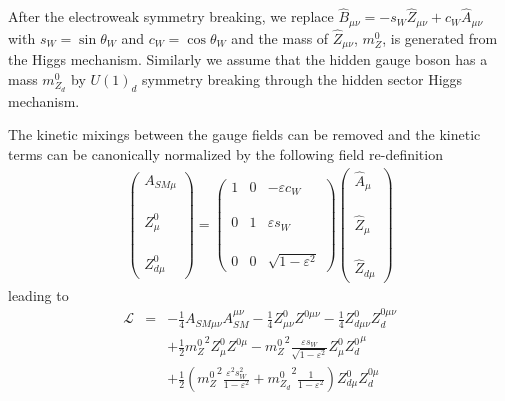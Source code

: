 \documentclass[5p,times]{elsarticle}
\newcommand\ba{\begin{eqnarray}}
\newcommand\ea{\end{eqnarray}}
\begin{document}
 After the electroweak symmetry breaking, we replace $\hat{B}_{\mu\nu}= -s_W \hat{Z}_{\mu \nu} + c_W \hat{A}_{\mu \nu}$ with $s_W=\sin\theta_W$ and $c_W=\cos\theta_W$ and the mass of $\hat{Z}_{\mu \nu}$, $m_Z^0$, is generated from the Higgs mechanism. Similarly we assume that the hidden gauge boson has a mass $m_{Z_d}^0$ by $U(1)_d$ symmetry breaking through the hidden sector Higgs mechanism.
 
  
The kinetic mixings between the gauge fields can be removed and the kinetic terms can be canonically normalized by the following field re-definition
   \ba
\left( \begin{array}{c} A_{SM\mu} \\ \phantom{1} \\ Z_\mu^0 \\ \phantom{1} \\ Z_{d\mu}^0 \end{array} \right) = \left( \begin{array}{ccc} 1&0 & -\varepsilon c_W \\ \phantom{1}&\phantom{1} & \phantom{1} \\0&1&\varepsilon s_W \\ \phantom{1}&\phantom{1} & \phantom{1}\\ 0& 0& \sqrt{1-\varepsilon^2} \end{array} \right) \left( \begin{array}{c} \hat{A}_\mu\\ \phantom{1} \\ \hat{Z}_\mu \\ \phantom{1} \\ \hat{Z}_{d\mu} \end{array} \right)
\ea
  leading to
   \ba
\mathcal{L}&=&-\frac{1}{4}A_{SM\mu\nu}A_{SM}^{\mu\nu}-\frac{1}{4}Z^0_{\mu\nu}Z^{0\mu\nu}-\frac{1}{4}Z^0_{d\mu\nu}Z_d^{0\mu\nu}\nonumber\\
&&+\frac{1}{2}{m_Z^0}^2Z^0_\mu Z^{0\mu}-{m_Z^0}^2\frac{\varepsilon s_W}{\sqrt{1-\varepsilon^2}}Z^0_\mu {Z^0_d}^\mu\nonumber\\
&&+\frac{1}{2}\left({m_Z^0}^2\frac{\varepsilon^2s^2_W}{1-\varepsilon^2} +{m_{Z_d}^0}^2\frac{1}{1-\varepsilon^2} \right)Z^0_{d\mu}Z_d^{0\mu}
\ea
\end{document}
